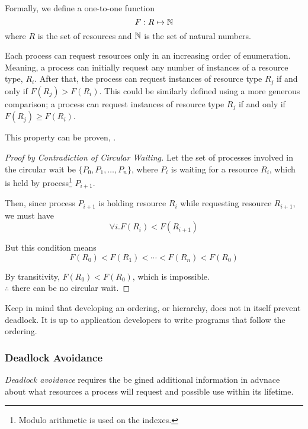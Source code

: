 Formally, we define a one-to-one function
\begin{equation*}
F: R \mapsto \operatorname{\mathbb{N}}
\end{equation*}
where $R$ is the set of resources and  $\operatorname{\mathbb{N}}$ is the set of natural numbers.

Each process can request resources only in an increasing order of enumeration.
Meaning, a process can initially request any number of instances of a resource type, $R_{i}$.
After that, the process can request instances of resource type $R_{j}$ if and only if $F(R_{j}) > F(R_{i})$.
This could be similarly defined using a more generous comparison; a process can request instances of resource type $R_{j}$ if and only if $F(R_{j}) \geq F(R_{i})$.

This property can be proven, .

\begin{proof}[Proof by Contradiction of Circular Waiting]\label{proof:Circular_Wait}
  Let the set of processes involved in the circular wait be $\lbrace P_{0}, P_{1}, \ldots, P_{n} \rbrace$, where $P_{i}$ is waiting for a resource $R_{i}$, which is held by process\footnote{Modulo arithmetic is used on the indexes.} $P_{i+1}$.

  Then, since process $P_{i+1}$ is holding resource $R_{i}$ while requesting resource $R_{i+1}$, we must have
  \begin{equation*}
    \forall i. F(R_{i}) < F(R_{i+1})
  \end{equation*}

  But this condition means
  \begin{equation*}
    F(R_{0}) < F(R_{1}) < \cdots < F(R_{n}) < F (R_{0})
  \end{equation*}

  By transitivity, $F(R_{0}) < F(R_{0})$, which is impossible. \\
  $\therefore$ there can be no circular wait.
\end{proof}

\begin{blackbox}
  Keep in mind that developing an ordering, or hierarchy, does not in itself prevent deadlock.
  It is up to application developers to write programs that follow the ordering.
\end{blackbox}

\subsubsection{Deadlock Avoidance}\label{subsubsec:Deadlock_Avoidance}
\begin{definition}\label{def:Deadlock_Avoidance}
  \emph{Deadlock avoidance} requires the  be gined additional information in advnace about what resources a process will request and possible use within its lifetime.
\end{definition}

